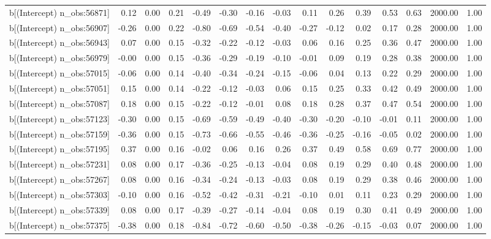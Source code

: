 \begin{table}[ht]
\begin{tabular}{rrrrrrrrrrrrrrr}
  b[(Intercept) n\_obs:56871] & 0.12 & 0.00 & 0.21 & -0.49 & -0.30 & -0.16 & -0.03 & 0.11 & 0.26 & 0.39 & 0.53 & 0.63 & 2000.00 & 1.00 \\ 
  b[(Intercept) n\_obs:56907] & -0.26 & 0.00 & 0.22 & -0.80 & -0.69 & -0.54 & -0.40 & -0.27 & -0.12 & 0.02 & 0.17 & 0.28 & 2000.00 & 1.00 \\ 
  b[(Intercept) n\_obs:56943] & 0.07 & 0.00 & 0.15 & -0.32 & -0.22 & -0.12 & -0.03 & 0.06 & 0.16 & 0.25 & 0.36 & 0.47 & 2000.00 & 1.00 \\ 
  b[(Intercept) n\_obs:56979] & -0.00 & 0.00 & 0.15 & -0.36 & -0.29 & -0.19 & -0.10 & -0.01 & 0.09 & 0.19 & 0.28 & 0.38 & 2000.00 & 1.00 \\ 
  b[(Intercept) n\_obs:57015] & -0.06 & 0.00 & 0.14 & -0.40 & -0.34 & -0.24 & -0.15 & -0.06 & 0.04 & 0.13 & 0.22 & 0.29 & 2000.00 & 1.00 \\ 
  b[(Intercept) n\_obs:57051] & 0.15 & 0.00 & 0.14 & -0.22 & -0.12 & -0.03 & 0.06 & 0.15 & 0.25 & 0.33 & 0.42 & 0.49 & 2000.00 & 1.00 \\ 
  b[(Intercept) n\_obs:57087] & 0.18 & 0.00 & 0.15 & -0.22 & -0.12 & -0.01 & 0.08 & 0.18 & 0.28 & 0.37 & 0.47 & 0.54 & 2000.00 & 1.00 \\ 
  b[(Intercept) n\_obs:57123] & -0.30 & 0.00 & 0.15 & -0.69 & -0.59 & -0.49 & -0.40 & -0.30 & -0.20 & -0.10 & -0.01 & 0.11 & 2000.00 & 1.00 \\ 
  b[(Intercept) n\_obs:57159] & -0.36 & 0.00 & 0.15 & -0.73 & -0.66 & -0.55 & -0.46 & -0.36 & -0.25 & -0.16 & -0.05 & 0.02 & 2000.00 & 1.00 \\ 
  b[(Intercept) n\_obs:57195] & 0.37 & 0.00 & 0.16 & -0.02 & 0.06 & 0.16 & 0.26 & 0.37 & 0.49 & 0.58 & 0.69 & 0.77 & 2000.00 & 1.00 \\ 
  b[(Intercept) n\_obs:57231] & 0.08 & 0.00 & 0.17 & -0.36 & -0.25 & -0.13 & -0.04 & 0.08 & 0.19 & 0.29 & 0.40 & 0.48 & 2000.00 & 1.00 \\ 
  b[(Intercept) n\_obs:57267] & 0.08 & 0.00 & 0.16 & -0.34 & -0.24 & -0.13 & -0.03 & 0.08 & 0.19 & 0.29 & 0.38 & 0.46 & 2000.00 & 1.00 \\ 
  b[(Intercept) n\_obs:57303] & -0.10 & 0.00 & 0.16 & -0.52 & -0.42 & -0.31 & -0.21 & -0.10 & 0.01 & 0.11 & 0.23 & 0.29 & 2000.00 & 1.00 \\ 
  b[(Intercept) n\_obs:57339] & 0.08 & 0.00 & 0.17 & -0.39 & -0.27 & -0.14 & -0.04 & 0.08 & 0.19 & 0.30 & 0.41 & 0.49 & 2000.00 & 1.00 \\ 
  b[(Intercept) n\_obs:57375] & -0.38 & 0.00 & 0.18 & -0.84 & -0.72 & -0.60 & -0.50 & -0.38 & -0.26 & -0.15 & -0.03 & 0.07 & 2000.00 & 1.00 \\ 

\end{tabular}
\end{table}
